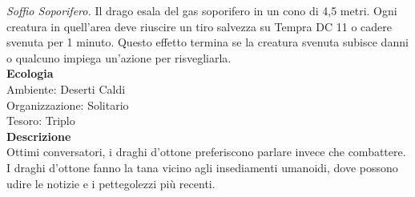 \begin{multicols}{2}
\emph{Soffio Soporifero.} Il drago esala del gas soporifero in un cono di 4,5 metri. Ogni creatura in quell'area deve riuscire un tiro salvezza su Tempra DC 11 o cadere svenuta per 1 minuto. Questo effetto termina se la creatura svenuta subisce danni o qualcuno impiega un'azione per risvegliarla.\\
\textbf{Ecologia}\\
Ambiente: Deserti Caldi\\
Organizzazione: Solitario\\
Tesoro: Triplo\\
\textbf{Descrizione}\\
Ottimi conversatori, i draghi d’ottone preferiscono parlare invece che combattere. I draghi d’ottone fanno la tana vicino agli insediamenti umanoidi, dove possono udire le notizie e i pettegolezzi più recenti.\\



\end{multicols}
